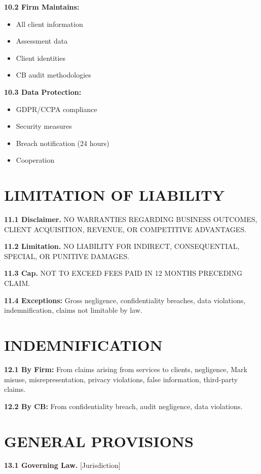 \documentclass[11pt,a4paper]{article}
\begin{document}
\textbf{10.2 Firm Maintains:}
\begin{itemize}
\item All client information
\item Assessment data
\item Client identities
\item CB audit methodologies
\end{itemize}

\textbf{10.3 Data Protection:}
\begin{itemize}
\item GDPR/CCPA compliance
\item Security measures
\item Breach notification (24 hours)
\item Cooperation
\end{itemize}

\section{LIMITATION OF LIABILITY}

\textbf{11.1 Disclaimer.} NO WARRANTIES REGARDING BUSINESS OUTCOMES, CLIENT ACQUISITION, REVENUE, OR COMPETITIVE ADVANTAGES.

\textbf{11.2 Limitation.} NO LIABILITY FOR INDIRECT, CONSEQUENTIAL, SPECIAL, OR PUNITIVE DAMAGES.

\textbf{11.3 Cap.} NOT TO EXCEED FEES PAID IN 12 MONTHS PRECEDING CLAIM.

\textbf{11.4 Exceptions:} Gross negligence, confidentiality breaches, data violations, indemnification, claims not limitable by law.

\section{INDEMNIFICATION}

\textbf{12.1 By Firm:} From claims arising from services to clients, negligence, Mark misuse, misrepresentation, privacy violations, false information, third-party claims.

\textbf{12.2 By CB:} From confidentiality breach, audit negligence, data violations.

\section{GENERAL PROVISIONS}

\textbf{13.1 Governing Law.} [Jurisdiction]
\end{document}
